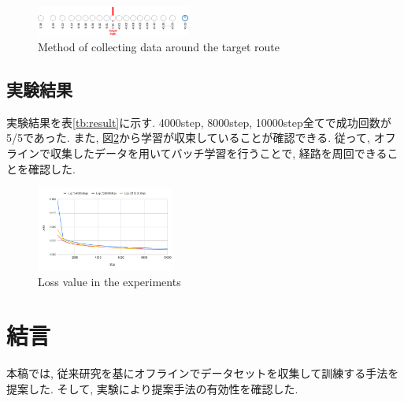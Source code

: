 \documentclass[10pt]{ujarticle}
\begin{document}
    \begin{figure}[h]
        \centering
        \includegraphics[width=0.45\textwidth]{fig/collect-data.png}
        \caption{Method of collecting data around the target route}
        \label{Fig:collect-data}
    \end{figure}

    \subsection{実験結果}実験結果を表\ref{tb:result}に示す. 4000step, 8000step, 10000step全てで成功回数が5/5であった. また, 図\ref{Fig:loss}から学習が収束していることが確認できる. 従って, オフラインで収集したデータを用いてバッチ学習を行うことで, 経路を周回できることを確認した.  

    \begin{table}[h]
        \centering
        \caption{Number of successes in the experiment}
        \label{tb:result}
      \end{table}

    \begin{figure}[h]
        \centering
        \includegraphics[width=0.4\textwidth]{fig/loss.png}
        \caption{Loss value in the experiments}
        \label{Fig:loss}
    \end{figure}

    \section{結\hspace{2zw}言}%
    本稿では, 従来研究を基にオフラインでデータセットを収集して訓練する手法を提案した. そして, 実験により提案手法の有効性を確認した. 
\end{document}
